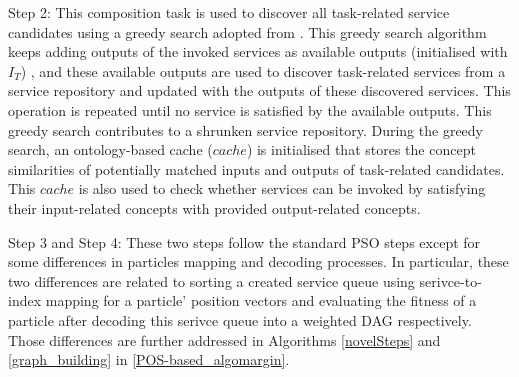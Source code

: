 \documentclass{llncs}
\begin{document}
Step 2: This composition task is used to discover all task-related service candidates using a greedy search adopted from \cite{ma2015hybrid}. This greedy search algorithm keeps adding outputs of the invoked services as available outputs (initialised with $I_{T}$) , and these available outputs are used to discover task-related services from a service repository and updated with the outputs of these discovered services. This operation is repeated until no service is satisfied by the available outputs. This greedy search contributes to a shrunken service repository. During the greedy search, an ontology-based cache ($cache$) is initialised that stores the concept similarities of potentially matched inputs and outputs of task-related candidates. This $cache$ is also used to check whether services can be invoked by satisfying their input-related concepts with provided output-related concepts.

Step 3 and Step 4: These two steps follow the standard PSO steps \cite{shi2001particle} except for some differences in particles mapping and decoding processes. In particular, these two differences are related to sorting a created service queue using serivce-to-index mapping for a particle' position vectors and evaluating the fitness of a particle after decoding this serivce queue into a weighted DAG respectively. Those differences are further addressed in Algorithms \ref{novelSteps} and \ref{graph_building} in \ref{POS-based_algomargin}.
\end{document}
